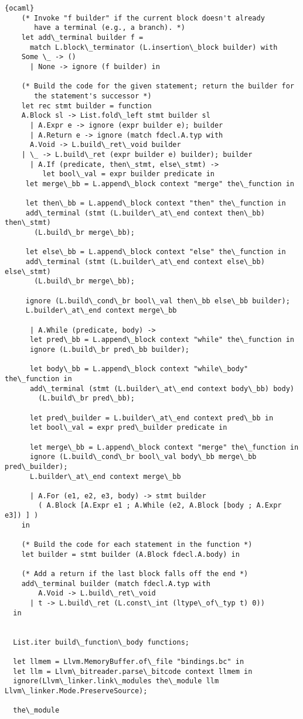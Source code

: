 \begin{lstlisting}{ocaml}
    (* Invoke "f builder" if the current block doesn't already
       have a terminal (e.g., a branch). *)
    let add\_terminal builder f =
      match L.block\_terminator (L.insertion\_block builder) with
	Some \_ -> ()
      | None -> ignore (f builder) in
	
    (* Build the code for the given statement; return the builder for
       the statement's successor *)
    let rec stmt builder = function
	A.Block sl -> List.fold\_left stmt builder sl
      | A.Expr e -> ignore (expr builder e); builder
      | A.Return e -> ignore (match fdecl.A.typ with
	  A.Void -> L.build\_ret\_void builder
	| \_ -> L.build\_ret (expr builder e) builder); builder
      | A.If (predicate, then\_stmt, else\_stmt) ->
         let bool\_val = expr builder predicate in
	 let merge\_bb = L.append\_block context "merge" the\_function in

	 let then\_bb = L.append\_block context "then" the\_function in
	 add\_terminal (stmt (L.builder\_at\_end context then\_bb) then\_stmt)
	   (L.build\_br merge\_bb);

	 let else\_bb = L.append\_block context "else" the\_function in
	 add\_terminal (stmt (L.builder\_at\_end context else\_bb) else\_stmt)
	   (L.build\_br merge\_bb);

	 ignore (L.build\_cond\_br bool\_val then\_bb else\_bb builder);
	 L.builder\_at\_end context merge\_bb

      | A.While (predicate, body) ->
	  let pred\_bb = L.append\_block context "while" the\_function in
	  ignore (L.build\_br pred\_bb builder);

	  let body\_bb = L.append\_block context "while\_body" the\_function in
	  add\_terminal (stmt (L.builder\_at\_end context body\_bb) body)
	    (L.build\_br pred\_bb);

	  let pred\_builder = L.builder\_at\_end context pred\_bb in
	  let bool\_val = expr pred\_builder predicate in

	  let merge\_bb = L.append\_block context "merge" the\_function in
	  ignore (L.build\_cond\_br bool\_val body\_bb merge\_bb pred\_builder);
	  L.builder\_at\_end context merge\_bb

      | A.For (e1, e2, e3, body) -> stmt builder
	    ( A.Block [A.Expr e1 ; A.While (e2, A.Block [body ; A.Expr e3]) ] )
    in

    (* Build the code for each statement in the function *)
    let builder = stmt builder (A.Block fdecl.A.body) in

    (* Add a return if the last block falls off the end *)
    add\_terminal builder (match fdecl.A.typ with
        A.Void -> L.build\_ret\_void
      | t -> L.build\_ret (L.const\_int (ltype\_of\_typ t) 0))
  in


  List.iter build\_function\_body functions;

  let llmem = Llvm.MemoryBuffer.of\_file "bindings.bc" in
  let llm = Llvm\_bitreader.parse\_bitcode context llmem in
  ignore(Llvm\_linker.link\_modules the\_module llm Llvm\_linker.Mode.PreserveSource);

  the\_module

\end{lstlisting}
